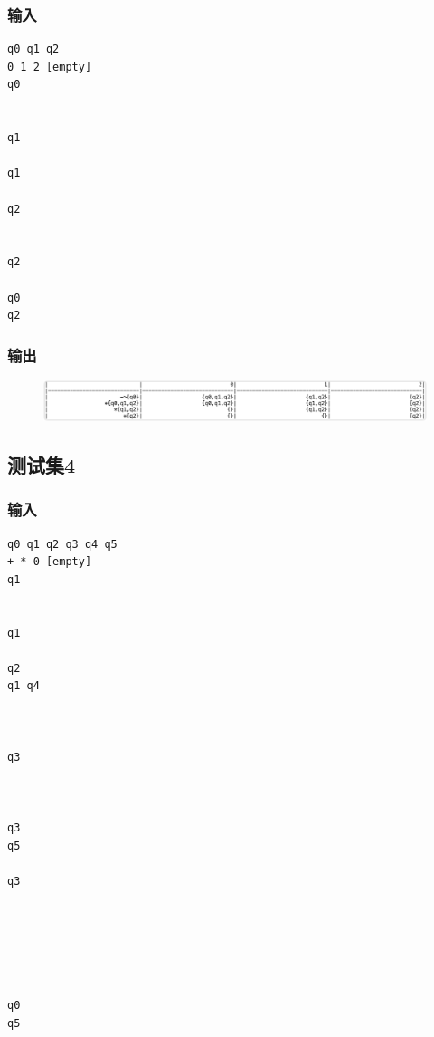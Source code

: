 \documentclass[lang=cn,11pt,a4paper,cite=authornum]{paper}
\begin{document}
\subsubsection{输入}

\begin{listing}[H]
\begin{verbatim}
q0 q1 q2
0 1 2 [empty]
q0


q1

q1

q2


q2

q0
q2
\end{verbatim}
\end{listing}

\subsubsection{输出}

\begin{figure}[htbp]

    \centering\includegraphics[width=\textwidth]{./Images/img7.png}

\end{figure}

\subsection{测试集4}

\subsubsection{输入}

\begin{listing}[H]
\begin{verbatim}
q0 q1 q2 q3 q4 q5
+ * 0 [empty]
q1
  

q1

q2
q1 q4



q3



q3
q5

q3






q0
q5
\end{verbatim}
\end{listing}
\end{document}
